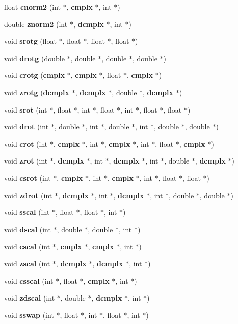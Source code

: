 \begin{CompactItemize}
\item 
float {\bf cnorm2} (int $\ast$, {\bf cmplx} $\ast$, int $\ast$)
\item 
double {\bf znorm2} (int $\ast$, {\bf dcmplx} $\ast$, int $\ast$)
\item 
void {\bf srotg} (float $\ast$, float $\ast$, float $\ast$, float $\ast$)
\item 
void {\bf drotg} (double $\ast$, double $\ast$, double $\ast$, double $\ast$)
\item 
void {\bf crotg} ({\bf cmplx} $\ast$, {\bf cmplx} $\ast$, float $\ast$, {\bf cmplx} $\ast$)
\item 
void {\bf zrotg} ({\bf dcmplx} $\ast$, {\bf dcmplx} $\ast$, double $\ast$, {\bf dcmplx} $\ast$)
\item 
void {\bf srot} (int $\ast$, float $\ast$, int $\ast$, float $\ast$, int $\ast$, float $\ast$, float $\ast$)
\item 
void {\bf drot} (int $\ast$, double $\ast$, int $\ast$, double $\ast$, int $\ast$, double $\ast$, double $\ast$)
\item 
void {\bf crot} (int $\ast$, {\bf cmplx} $\ast$, int $\ast$, {\bf cmplx} $\ast$, int $\ast$, float $\ast$, {\bf cmplx} $\ast$)
\item 
void {\bf zrot} (int $\ast$, {\bf dcmplx} $\ast$, int $\ast$, {\bf dcmplx} $\ast$, int $\ast$, double $\ast$, {\bf dcmplx} $\ast$)
\item 
void {\bf csrot} (int $\ast$, {\bf cmplx} $\ast$, int $\ast$, {\bf cmplx} $\ast$, int $\ast$, float $\ast$, float $\ast$)
\item 
void {\bf zdrot} (int $\ast$, {\bf dcmplx} $\ast$, int $\ast$, {\bf dcmplx} $\ast$, int $\ast$, double $\ast$, double $\ast$)
\item 
void {\bf sscal} (int $\ast$, float $\ast$, float $\ast$, int $\ast$)
\item 
void {\bf dscal} (int $\ast$, double $\ast$, double $\ast$, int $\ast$)
\item 
void {\bf cscal} (int $\ast$, {\bf cmplx} $\ast$, {\bf cmplx} $\ast$, int $\ast$)
\item 
void {\bf zscal} (int $\ast$, {\bf dcmplx} $\ast$, {\bf dcmplx} $\ast$, int $\ast$)
\item 
void {\bf csscal} (int $\ast$, float $\ast$, {\bf cmplx} $\ast$, int $\ast$)
\item 
void {\bf zdscal} (int $\ast$, double $\ast$, {\bf dcmplx} $\ast$, int $\ast$)
\item 
void {\bf sswap} (int $\ast$, float $\ast$, int $\ast$, float $\ast$, int $\ast$)

\end{CompactItemize}
